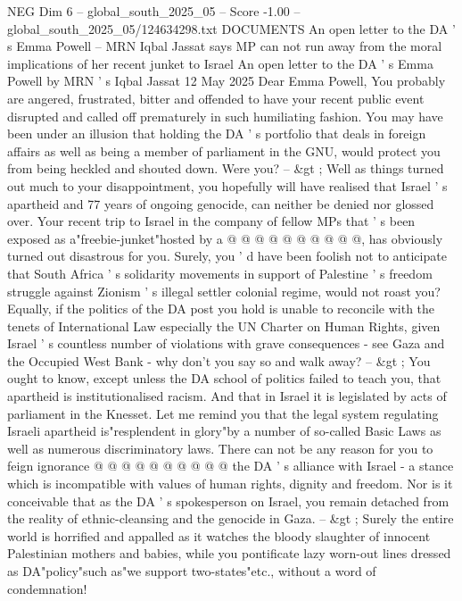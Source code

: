 \begin{textsample}{NEG Dim 6 – global\_south\_2025\_05 – Score -1.00 – global\_south\_2025\_05/124634298.txt}  \label{ex:f6_neg_389}
DOCUMENTS An open letter to the DA ' s Emma Powell -- MRN Iqbal Jassat says MP can not run away from the moral implications of her recent junket to Israel An open letter to the DA ' s Emma Powell by MRN ' s Iqbal Jassat 12 May 2025 Dear Emma Powell, You probably are angered, frustrated, bitter and offended to have your recent public event disrupted and called off prematurely in such humiliating fashion.
You may have been under an illusion that holding the DA ' s portfolio that deals in foreign affairs as well as being a member of parliament in the GNU, would protect you from being heckled and shouted down.
Were you? -- \&gt ; Well as things turned out much to your disappointment, you hopefully will have realised that Israel ' s apartheid and 77 years of ongoing genocide, can neither be denied nor glossed over.
Your recent trip to Israel in the company of fellow MPs that ' s been exposed as a"freebie-junket"hosted by a @ @ @ @ @ @ @ @ @ @, has obviously turned out disastrous for you.
Surely, you ' d have been foolish not to anticipate that South Africa ' s solidarity movements in support of Palestine ' s freedom struggle against Zionism ' s illegal settler colonial regime, would not roast you?
Equally, if the politics of the DA post you hold is unable to reconcile with the tenets of International Law especially the UN Charter on Human Rights, given Israel ' s countless number of violations with grave consequences - see Gaza and the Occupied West Bank - why don't you say so and walk away? -- \&gt ; You ought to know, except unless the DA school of politics failed to teach you, that apartheid is institutionalised racism.
And that in Israel it is legislated by acts of parliament in the Knesset.
Let me remind you that the legal system regulating Israeli apartheid is"resplendent in glory"by a number of so-called Basic Laws as well as numerous discriminatory laws.
There can not be any reason for you to feign ignorance @ @ @ @ @ @ @ @ @ @ the DA ' s alliance with Israel - a stance which is incompatible with values of human rights, dignity and freedom.
Nor is it conceivable that as the DA ' s spokesperson on Israel, you remain detached from the reality of ethnic-cleansing and the genocide in Gaza. -- \&gt ; Surely the entire world is horrified and appalled as it watches the bloody slaughter of innocent Palestinian mothers and babies, while you pontificate lazy worn-out lines dressed as DA"policy"such as"we support two-states"etc., without a word of condemnation!

\end{textsample}
